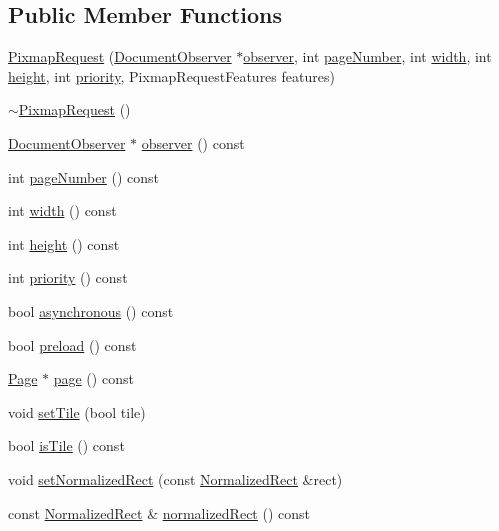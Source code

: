 \subsection*{Public Member Functions}
\begin{DoxyCompactItemize}
\item 
\hyperlink{classOkular_1_1PixmapRequest_a6d66f17282607930f73d6ef55aa2b0f2}{Pixmap\+Request} (\hyperlink{classOkular_1_1DocumentObserver}{Document\+Observer} $\ast$\hyperlink{classOkular_1_1PixmapRequest_af7abb325ca484ded40c556cf0ad5b793}{observer}, int \hyperlink{classOkular_1_1PixmapRequest_a50f959175182137dbb9e2dbd6ddd71aa}{page\+Number}, int \hyperlink{classOkular_1_1PixmapRequest_a3e82f09b91a52efed7435eeb9903e5fc}{width}, int \hyperlink{classOkular_1_1PixmapRequest_a782392a2efc6303994c7e0158c76ee06}{height}, int \hyperlink{classOkular_1_1PixmapRequest_ae6ea9158b7d643d3ace82da2e7231473}{priority}, Pixmap\+Request\+Features features)
\item 
\hyperlink{classOkular_1_1PixmapRequest_a67109f7c71191e56cb90ba56e7657197}{$\sim$\+Pixmap\+Request} ()
\item 
\hyperlink{classOkular_1_1DocumentObserver}{Document\+Observer} $\ast$ \hyperlink{classOkular_1_1PixmapRequest_af7abb325ca484ded40c556cf0ad5b793}{observer} () const 
\item 
int \hyperlink{classOkular_1_1PixmapRequest_a50f959175182137dbb9e2dbd6ddd71aa}{page\+Number} () const 
\item 
int \hyperlink{classOkular_1_1PixmapRequest_a3e82f09b91a52efed7435eeb9903e5fc}{width} () const 
\item 
int \hyperlink{classOkular_1_1PixmapRequest_a782392a2efc6303994c7e0158c76ee06}{height} () const 
\item 
int \hyperlink{classOkular_1_1PixmapRequest_ae6ea9158b7d643d3ace82da2e7231473}{priority} () const 
\item 
bool \hyperlink{classOkular_1_1PixmapRequest_a11fee76ef3da1589a28d455519c946a7}{asynchronous} () const 
\item 
bool \hyperlink{classOkular_1_1PixmapRequest_a9401ac40032a7ca0e018687bf7000a74}{preload} () const 
\item 
\hyperlink{classOkular_1_1Page}{Page} $\ast$ \hyperlink{classOkular_1_1PixmapRequest_a83b5e81f2e908e70f3c19a0a3c07fab3}{page} () const 
\item 
void \hyperlink{classOkular_1_1PixmapRequest_a386e7798833195f24d9598f696de8f73}{set\+Tile} (bool tile)
\item 
bool \hyperlink{classOkular_1_1PixmapRequest_a7e50105623628d53dc9d82c45d7863bd}{is\+Tile} () const 
\item 
void \hyperlink{classOkular_1_1PixmapRequest_ada39238e8f4748b0c65dd97a3abcda77}{set\+Normalized\+Rect} (const \hyperlink{classOkular_1_1NormalizedRect}{Normalized\+Rect} \&rect)
\item 
const \hyperlink{classOkular_1_1NormalizedRect}{Normalized\+Rect} \& \hyperlink{classOkular_1_1PixmapRequest_ab867bc095f18ece11fb14ac0201a227d}{normalized\+Rect} () const 
\end{DoxyCompactItemize}
